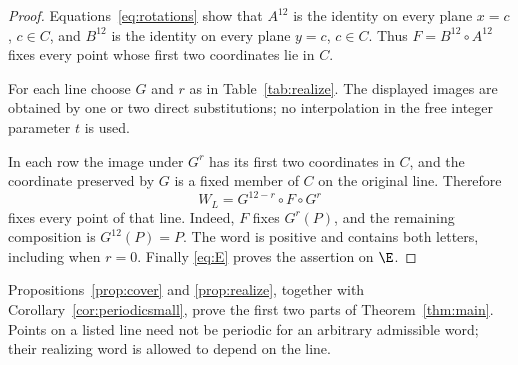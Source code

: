 \begin{proof}
Equations~\eqref{eq:rotations} show that $A^{12}$ is the
identity on every plane $x=c$, $c\in C$, and $B^{12}$
is the identity on every plane $y=c$, $c\in C$.
Thus $F=B^{12}\circ A^{12}$ fixes every point whose first
two coordinates lie in $C$.

For each line choose $G$ and $r$ as in
Table~\ref{tab:realize}. The displayed images are obtained
by one or two direct substitutions; no interpolation in
the free integer parameter $t$ is used.



In each row the image under $G^r$ has its first two
coordinates in $C$, and the coordinate preserved by $G$
is a fixed member of $C$ on the original line. Therefore
\begin{equation}\label{eq:lineword}
 W_L=G^{12-r}\circ F\circ G^r
\end{equation}
fixes every point of that line. Indeed, $F$ fixes $G^r(P)$,
and the remaining composition is $G^{12}(P)=P$.
The word is positive and contains both letters, including
when $r=0$. Finally \eqref{eq:E} proves the assertion
on $\E$.
\end{proof}

Propositions~\ref{prop:cover} and \ref{prop:realize}, together
with Corollary~\ref{cor:periodicsmall}, prove the first two
parts of Theorem~\ref{thm:main}. Points on a listed line need
not be periodic for an arbitrary admissible word; their
realizing word is allowed to depend on the line.
